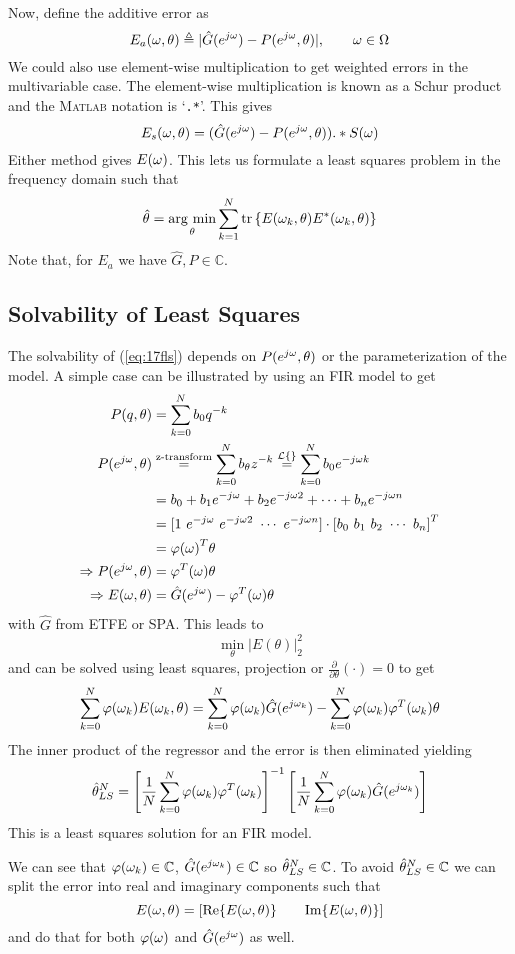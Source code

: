 Now, define the additive error as
$$E_a(\omega,\theta) \triangleq |\hat{G}(e^{j\omega})-P(e^{j\omega},\theta)|, \qquad \omega\in\Omega$$
We could also use element-wise multiplication to get weighted errors in the multivariable case.
The element-wise multiplication is known as a Schur product and the \textsc{Matlab} notation is `\texttt{.*}'.
This gives
$$E_s(\omega,\theta) = (\hat{G}(e^{j\omega})-P(e^{j\omega},\theta)).*S(\omega)$$
Either method gives $E(\omega)$.
This lets us formulate a least squares problem in the frequency domain such that
\begin{align}
\label{eq:17fls}
\hat{\theta} = \mathop{\arg\,\min}\limits_\theta\sum_{k=1}^N\text{tr}\left\lbrace E(\omega_k,\theta)E^\ast(\omega_k,\theta)\right\rbrace
\end{align}
Note that, for $E_a$ we have $\hat{G},P\in\mathbb{C}$.

\subsection{Solvability of Least Squares}
The solvability of (\ref{eq:17fls}) depends on $P(e^{j\omega},\theta)$ or the parameterization of the model.
A simple case can be illustrated by using an FIR model to get
\begin{align*}
P(q,\theta) &= \sum_{k=0}^N b_0q^{-k} \\
P(e^{j\omega},\theta) &\stackrel{\text{z-transform}}{=} \sum_{k=0}^N b_\theta z^{-k} \stackrel{\mathcal{L}\{\}}{=} \sum_{k=0}^N b_0e^{-j\omega k} \\
&= b_0 + b_1e^{-j\omega} + b_2e^{-j\omega 2} + \cdots + b_n e^{-j\omega n} \\
&= [1~e^{-j\omega}~e^{-j\omega 2}~\cdots~e^{-j\omega n}] \cdot {[b_0~b_1~b_2~\cdots~b_n]}^T \\
&= \varphi{(\omega)}^T\theta \\
\Rightarrow P(e^{j\omega},\theta) &= \varphi^T(\omega)\theta \\
\Rightarrow E(\omega,\theta) &= \hat{G}(e^{j\omega})-\varphi^T(\omega)\theta
\end{align*}
with $\hat{G}$ from ETFE or SPA\@.
This leads to
$$\min_\theta|E(\theta)|_2^2$$
and can be solved using least squares, projection or $\tfrac{\partial}{\partial\theta}(\cdot)=0$ to get
$$\sum_{k=0}^N\varphi(\omega_k)E(\omega_k,\theta) = \sum_{k=0}^N\varphi(\omega_k)\hat{G}(e^{j\omega_k}) - \sum_{k=0}^N\varphi(\omega_k)\varphi^T(\omega_k)\theta$$
The inner product of the regressor and the error is then eliminated yielding
$$\hat{\theta}_{LS}^N = {\left[\frac{1}{N}\sum_{k=0}^N\varphi(\omega_k)\varphi^T(\omega_k)\right]}^{-1}\left[\frac{1}{N}\sum_{k=0}^N\varphi(\omega_k)\hat{G}(e^{j\omega_k})\right]$$
This is a least squares solution for an FIR model.

We can see that $\varphi(\omega_k)\in\mathbb{C}$, $\hat{G}(e^{j\omega_k})\in\mathbb{C}$ so $\hat{\theta}_{LS}^N\in\mathbb{C}$.
To avoid $\hat{\theta}_{LS}^N\in\mathbb{C}$ we can split the error into real and imaginary components such that
$$E(\omega,\theta) = \left[\text{Re}\{E(\omega,\theta)\} \qquad \text{Im}\{E(\omega,\theta)\}\right]$$
and do that for both $\varphi(\omega)$ and $\hat{G}(e^{j\omega})$ as well.

